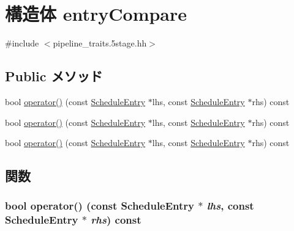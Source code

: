 \hypertarget{structThePipeline_1_1entryCompare}{
\section{構造体 entryCompare}
\label{structThePipeline_1_1entryCompare}
}


{\ttfamily \#include $<$pipeline\_\-traits.5stage.hh$>$}\subsection*{Public メソッド}
\begin{DoxyCompactItemize}
\item 
bool \hyperlink{structThePipeline_1_1entryCompare_a7e59a50d3469340b40f804ec6d38594f}{operator()} (const \hyperlink{structThePipeline_1_1ScheduleEntry}{ScheduleEntry} $\ast$lhs, const \hyperlink{structThePipeline_1_1ScheduleEntry}{ScheduleEntry} $\ast$rhs) const 
\item 
bool \hyperlink{structThePipeline_1_1entryCompare_a7e59a50d3469340b40f804ec6d38594f}{operator()} (const \hyperlink{structThePipeline_1_1ScheduleEntry}{ScheduleEntry} $\ast$lhs, const \hyperlink{structThePipeline_1_1ScheduleEntry}{ScheduleEntry} $\ast$rhs) const 
\item 
bool \hyperlink{structThePipeline_1_1entryCompare_a7e59a50d3469340b40f804ec6d38594f}{operator()} (const \hyperlink{structThePipeline_1_1ScheduleEntry}{ScheduleEntry} $\ast$lhs, const \hyperlink{structThePipeline_1_1ScheduleEntry}{ScheduleEntry} $\ast$rhs) const 
\end{DoxyCompactItemize}


\subsection{関数}
\hypertarget{structThePipeline_1_1entryCompare_a7e59a50d3469340b40f804ec6d38594f}{
\subsubsection[{operator()}]{\setlength{\rightskip}{0pt plus 5cm}bool operator() (const {\bf ScheduleEntry} $\ast$ {\em lhs}, \/  const {\bf ScheduleEntry} $\ast$ {\em rhs}) const}}
\label{structThePipeline_1_1entryCompare_a7e59a50d3469340b40f804ec6d38594f}



